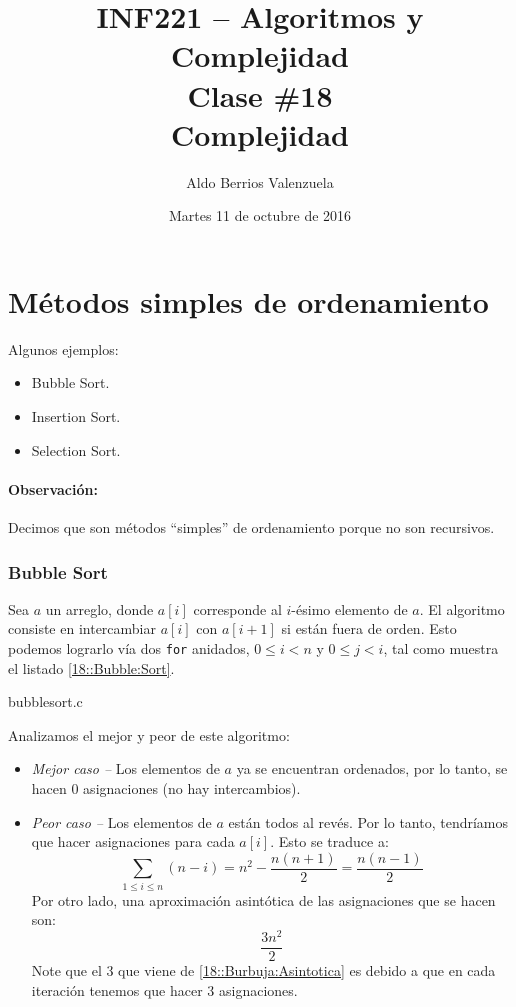 \documentclass[english, spanish, fleqn, 10pt]{article}
\author{Aldo Berrios Valenzuela}
\title{INF221 -- Algoritmos y Complejidad\\[.4\baselineskip]Clase \#18\\Complejidad}
\date{Martes 11 de octubre de 2016}
\newcommand{\comillas}[1]{``#1''}
\numberwithin{equation}{section}
\newcommand{\nparentesis}[1]{\left( #1 \right)}
\newcommand{\ncorchetes}[1]{\left[ #1 \right]}
\theoremstyle{definition}
\begin{document}
\maketitle

\section{Métodos simples de ordenamiento}
Algunos ejemplos:
\begin{itemize}
	\item Bubble Sort.
	
	\item Insertion Sort.
	
	\item Selection Sort.
\end{itemize}
\paragraph{Observación: } Decimos que son métodos \comillas{simples} de ordenamiento porque no son recursivos.

\subsubsection{Bubble Sort}
Sea $a$ un arreglo, donde $a\ncorchetes{i}$ corresponde al $i$-ésimo elemento de $a$. El algoritmo consiste en intercambiar $a\ncorchetes{i}$ con $a\ncorchetes{i+1}$ si están fuera de orden. Esto podemos lograrlo vía dos \texttt{for} anidados, $0 \leq i < n$ y $0 \leq j < i$, tal como muestra el listado \ref{18::Bubble:Sort}.


  {bubblesort.c}
  
Analizamos el mejor y peor de este algoritmo:
\begin{itemize}
	\item \emph{Mejor caso -- }Los elementos de $a$ ya se encuentran ordenados, por lo tanto, se hacen 0 asignaciones (no hay intercambios).
	
	\item \emph{Peor caso -- }Los elementos de $a$ están todos al revés. Por lo tanto, tendríamos que hacer asignaciones para cada $a\ncorchetes{i}$. Esto se traduce a:
	\begin{equation*}
	\sum_{1 \leq i \leq n}\nparentesis{n - i} = n^2 - \dfrac{n\nparentesis{n+1}}{2} = \dfrac{n \nparentesis{n-1}}{2}
	\end{equation*}
	Por otro lado, una aproximación asintótica de las asignaciones que se hacen son:
	\begin{equation}\label{18::Burbuja:Asintotica}
	\dfrac{3n^2}{2}
	\end{equation}
	Note que el $3$ que viene de \eqref{18::Burbuja:Asintotica} es debido a que en cada iteración tenemos que hacer 3 asignaciones.
	
	\end{itemize}
\end{document}
